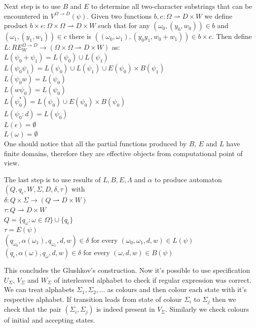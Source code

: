 Next step is to use $B$ and $E$ to determine all two-character substrings that can be encountered in $V^{\Omega\rightarrow D}(\psi)$. Given two functions $b,e:\Omega \rightharpoonup D \times W$ we define product $b \times e : \Omega \times \Omega \rightharpoonup  D \times W$ such that for any $(\omega_0,(y_0,w_0))\in b$ and $(\omega_1,(y_1,w_1)) \in c$ there is $((\omega_0,\omega_1),(y_0y_1,w_0+w_1)) \in b\times e$. Then define $L:RE_W^{\Omega\rightarrow D} \rightarrow (\Omega \times \Omega \rightharpoonup  D \times W)$ as: \\
$L(\psi_0 + \psi_1) = L(\psi_0)\cup L(\psi_1) $ \\
$L(\psi_0 \psi_1) = L(\psi_0) \cup  L(\psi_1) \cup E(\psi_0) \times B(\psi_1)$ \\
$L(\psi_0 w) = L(\psi_0) $ \\
$L(w \psi_0 ) = L(\psi_0)$ \\
$L(\psi_0 ^*) =  L(\psi_0) \cup E(\psi_0) \times B(\psi_0)$ \\
$L(\psi_0 : d) =  L(\psi_0)$ \\
$L(\epsilon) =  \emptyset$ \\
$L(\omega) =  \emptyset$  \\
One should notice that all the partial functions produced by $B$, $E$ and $L$ have finite domains, therefore they are effective objects from computational point of view. 

The last step is to use results of $L,B,E,\Lambda$ and $\alpha$ to produce automaton $(Q,q_\epsilon,W,\Sigma,D,\delta,\tau)$ with \\
$\delta:Q \times \Sigma \rightarrow (Q\rightharpoonup D\times W)$ \\
$\tau:Q\rightharpoonup D \times W$ \\
$Q = \{q_\omega : \omega \in \Omega \} \cup \{q_\epsilon\}$ \\
$\tau = E(\psi)$ \\
$(q_{\omega_0},\alpha(\omega_1),q_{\omega_1},d,w)  \in \delta$ for every $(\omega_0,\omega_1,d,w) \in L(\psi) $ \\
$(q_\epsilon,\alpha(\omega),q_{\omega},d,w)  \in \delta$ for every $(\omega,d,w) \in B(\psi) $ 

This concludes the Glushkov's construction. Now it's possible to use specification $U_\Sigma$, $V_\Sigma$ and $W_\Sigma$ of interleaved alphabet to check if regular expression was correct. We can treat alphabets $\Sigma_1,\Sigma_2,...$ as colours and then colour each state with it's respective alphabet. If transition leads from state of colour $\Sigma_i$ to $\Sigma_j$ then we check that the pair $(\Sigma_i,\Sigma_j)$ is indeed present in $V_\Sigma$. Similarly we check colours of initial and accepting states.

